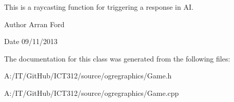 This is a raycasting function for triggering a response in A\-I. 

\begin{DoxyAuthor}{Author}
Arran Ford 
\end{DoxyAuthor}
\begin{DoxyDate}{Date}
09/11/2013 
\end{DoxyDate}


The documentation for this class was generated from the following files\-:\begin{DoxyCompactItemize}
\item 
A\-:/\-I\-T/\-Git\-Hub/\-I\-C\-T312/source/ogregraphics/Game.\-h\item 
A\-:/\-I\-T/\-Git\-Hub/\-I\-C\-T312/source/ogregraphics/Game.\-cpp\end{DoxyCompactItemize}
